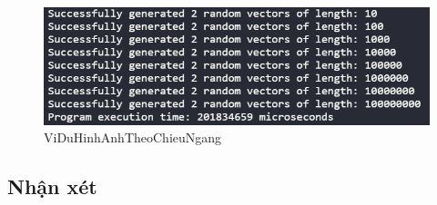  
\begin{figure}[h] %
\centering
\includegraphics[width=1\textwidth]{pictures/image.png} %
\caption{ViDuHinhAnhTheoChieuNgang} %
\label{pictures:nghia1} %
\end{figure} 






\subsection{Nhận xét}
\lipsum[1]